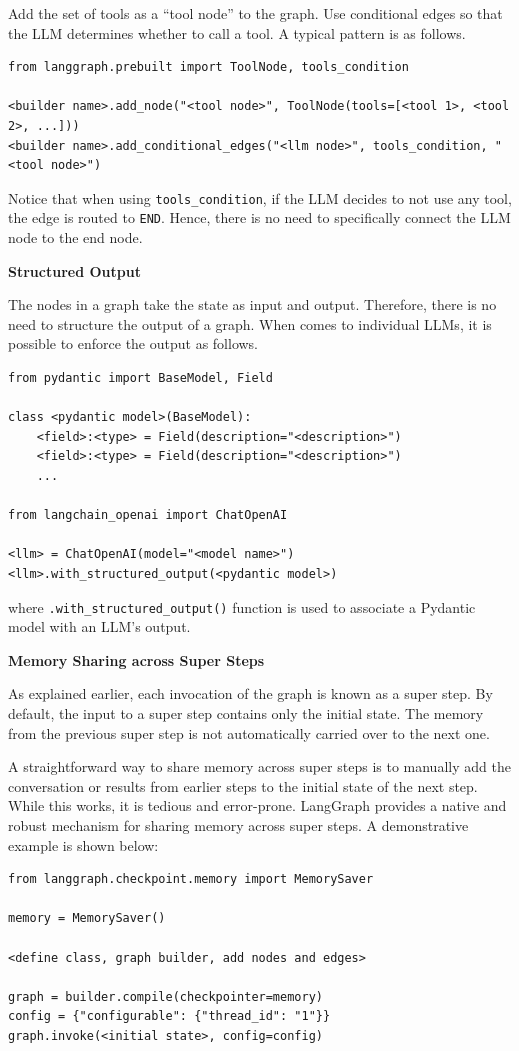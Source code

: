 Add the set of tools as a ``tool node'' to the graph. Use conditional edges so that the LLM determines whether to call a tool. A typical pattern is as follows.
\begin{lstlisting}
from langgraph.prebuilt import ToolNode, tools_condition

<builder name>.add_node("<tool node>", ToolNode(tools=[<tool 1>, <tool 2>, ...]))
<builder name>.add_conditional_edges("<llm node>", tools_condition, "<tool node>")
\end{lstlisting}
Notice that when using \verb|tools_condition|, if the LLM decides to not use any tool, the edge is routed to \verb|END|. Hence, there is no need to specifically connect the LLM node to the end node.

\vspace{0.1in}
\noindent \textbf{Structured Output}
\vspace{0.1in}

The nodes in a graph take the state as input and output. Therefore, there is no need to structure the output of a graph. When comes to individual LLMs, it is possible to enforce the output as follows.
\begin{lstlisting}
from pydantic import BaseModel, Field

class <pydantic model>(BaseModel):
    <field>:<type> = Field(description="<description>")
    <field>:<type> = Field(description="<description>")
    ...

from langchain_openai import ChatOpenAI

<llm> = ChatOpenAI(model="<model name>")
<llm>.with_structured_output(<pydantic model>)
\end{lstlisting}
where \verb|.with_structured_output()| function is used to associate a Pydantic model with an LLM's output.

\vspace{0.1in}
\noindent \textbf{Memory Sharing across Super Steps}
\vspace{0.1in}

As explained earlier, each invocation of the graph is known as a super step. By default, the input to a super step contains only the initial state. The memory from the previous super step is not automatically carried over to the next one. 

A straightforward way to share memory across super steps is to manually add the conversation or results from earlier steps to the initial state of the next step. While this works, it is tedious and error-prone. LangGraph provides a native and robust mechanism for sharing memory across super steps. A demonstrative example is shown below:
\begin{lstlisting}
from langgraph.checkpoint.memory import MemorySaver

memory = MemorySaver()

<define class, graph builder, add nodes and edges>

graph = builder.compile(checkpointer=memory)
config = {"configurable": {"thread_id": "1"}}
graph.invoke(<initial state>, config=config)
\end{lstlisting}


